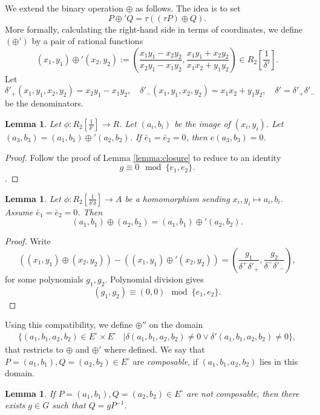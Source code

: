 \documentclass[18pt]{article}
\newtheorem{lemma}[theorem]{Lemma}
\newcommand{\f}[1]{\frac{1}{#1}}
\newcommand{\Eo}{E^\circ}
\def\cong{\equiv}
\begin{document}
We extend the binary operation $\oplus$ as follows.  The idea is to
set 
\begin{equation}\label{eqn:tauplus}
P\oplus' Q = \tau((\tau P)\oplus Q).
\end{equation}
More formally, calculating the right-hand side in terms of coordinates, 
 we define $(\oplus')$ by a pair of rational functions
\[
(x_1,y_1)\oplus' (x_2,y_2) := \left(\frac{x_1y_1 - x_2 y_2}{x_2
    y_1-x_1 y_2},\frac{x_1 y_1 + x_2 y_2}{x_1 x_2 + y_1 y_2}\right) 
    \in R_2[\f{\delta'}].
\]
Let
\[
\delta'_+(x_1,y_1,x_2,y_2) = x_2 y_1 - x_1 y_2,
\quad \delta'_-(x_1,y_1,x_2,y_2)= x_1 x_2 + y_1 y_2,
\quad \delta' = \delta'_+ \delta'_-
\] 
be the denominators.

\begin{lemma}  
  Let $\phi:R_2[\f{\delta'}]\to R$.  Let $(a_i,b_i)$ be the image of
  $(x_i,y_i)$.  Let $(a_3,b_3)=(a_1,b_1)\oplus' (a_2,b_2)$.  If $\bar
  e_1 = \bar e_2 = 0$, then $e(a_3,b_3)=0$.
\end{lemma}

\begin{proof} Follow the proof of Lemma \ref{lemma:closure} to reduce to an
identity
\[
g\cong 0 \mod \{e_1,e_2\}.
\].
\end{proof}

\begin{lemma} \label{lemma:extend} Let $\phi:R_2[\f{\delta'\delta}]\to
  A$ be a homomorphism sending $x_i,y_i\mapsto a_i,b_i$.  Assume $\bar
  e_1 = \bar e_ 2 = 0$. Then
\[
(a_1,b_1)\oplus (a_2,b_2)=(a_1,b_1)\oplus' (a_2,b_2).
\]
\end{lemma}

\begin{proof} Write
\[
((x_1,y_1)\oplus (x_2,y_2)) -
((x_1,y_1)\oplus' (x_2,y_2) ) = 
(\frac{g_1}{\delta^+\delta'_+},\frac{g_2}{\delta^-\delta'_-}),
\]
for some polynomials $g_1,g_2$.   Polynomial division gives
\[
(g_1,g_2) \cong (0,0) \mod \{e_1,e_2\}.
\]
\end{proof}

Using this compatibility, we define $\oplus''$ on the domain
\begin{align*}
\{(a_1,b_1,a_2,b_2)\in \Eo\times \Eo &\mid 
\delta(a_1,b_1,a_2,b_2)\ne 0 \vee
\delta'(a_1,b_1,a_2,b_2)\ne 0 \},
\end{align*}
that restricts to $\oplus$ and $\oplus'$ where defined.  We say that
$P=(a_1,b_1), Q=(a_2,b_2)\in \Eo$ are {\emph {composable}}, if
$(a_1,b_1,a_2,b_2)$ lies in this domain.

\begin{lemma}\label{lemma:noco} 
  If $P=(a_1,b_1),Q=(a_2,b_2)\in \Eo$ are not composable, then there
  exists $g\in G$ such that $Q= gP^{-1}$.
\end{lemma}
\end{document}
